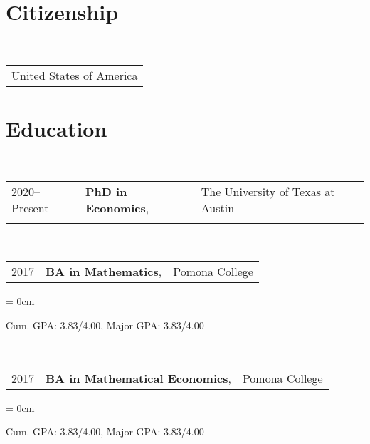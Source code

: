 \documentclass[a4paper, 11pt]{article}
\begin{document}
    \maketitle
    \thispagestyle{firststyle}
    
    \section{Citizenship}
      ~\begin{tabular}{l}
        United States of America\\
      \end{tabular}
      
    \section{Education}
      ~\begin{tabular}{lll}
        2020--Present & \textbf{PhD in Economics}, & The University of Texas at Austin\\
        \vspace*{-0.50em}
      \end{tabular}

      ~\begin{tabular}{lll}
        2017 & \textbf{BA in Mathematics}, & Pomona College\\
      \end{tabular}
      \begin{compactitem}\parskip = 0cm
        \item Cum. GPA: 3.83/4.00, Major GPA: 3.83/4.00\\
      \end{compactitem}
      
      \vspace*{1em}
      
      ~\begin{tabular}{lll}
        2017 & \textbf{BA in Mathematical Economics}, & Pomona College\\
      \end{tabular}
      \begin{compactitem}\parskip = 0cm
        \item Cum. GPA: 3.83/4.00, Major GPA: 3.83/4.00\\
      \end{compactitem}
      
\end{document}
